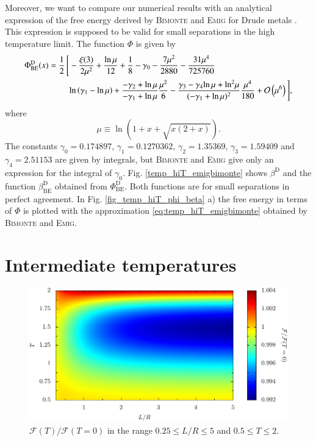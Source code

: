 Moreover, we want to compare our numerical results with an analytical expression
of the free energy derived by \textsc{Bimonte} and \textsc{Emig} for Drude
metals \cite{PhysRevLett.109.160403}. This
expression is supposed to be valid for small separations in the high
temperature limit. The function $\Phi$ is given by
\begin{align}
\nonumber
\Phi_\text{BE}^\text{D}(x) = \frac{1}{2} \, \Bigg[& -\frac{\xi(3)}{2\mu^2} + \frac{\text{ln}\,\mu}{12} + \frac{1}{8} - \gamma_0 - \frac{7\mu^2}{2880} - \frac{31\mu^4}{725760} \\
\label{eq:temp_hiT_emigbimonte}
&\text{ln}\left(\gamma_1-\text{ln}\,\mu\right) + \frac{-\gamma_2+\text{ln}\,\mu}{-\gamma_1+\text{ln}\,\mu} \frac{\mu^2}{6} - \frac{\gamma_3-\gamma_4\text{ln}\,\mu+\text{ln}^2\mu}{(-\gamma_1+\text{ln}\,\mu)^2} \frac{\mu^4}{180} + \mathcal{O}\left(\mu^6\right)\Bigg],
\end{align}
where
\begin{equation}
\mu \equiv \ln\left(1+x+\sqrt{x(2+x)}\right).
\end{equation}
The constants $\gamma_0 = 0.174897$, $\gamma_1 = 0.1270362$, $\gamma_2 =
1.35369$, $\gamma_3 = 1.59409$ and $\gamma_4 = 2.51153$ are given by integrals,
but \textsc{Bimonte} and \textsc{Emig} give only an expression for the integral of $\gamma_0$.
Fig. \ref{temp_hiT_emigbimonte} shows $\beta^\text{D}$ and the function $\beta_\text{BE}^\text{D}$ obtained from
$\Phi_\text{BE}^\text{D}$. Both functions are for small separations in perfect
agreement. In Fig. \ref{fig_temp_hiT_phi_beta} a) the free energy in terms of $\Phi$
is plotted with the approximation \eqref{eq:temp_hiT_emigbimonte} obtained by \textsc{Bimonte} and \textsc{Emig}.


\section{Intermediate temperatures}
\label{section_temp_intermediate}

\begin{figure}
    \begin{center}
    \includegraphics[scale=1]{plots/entropy_density_plot/plot_scaled_FbyF0.pdf}
    \end{center}

    \caption{$\mathcal{F}(T)/\mathcal{F}(T=0)$ in the range $0.25 \le L/R \le 5$ and $0.5 \le T \le 2$.}
    \label{fig:temp_intermediate}
\end{figure}

